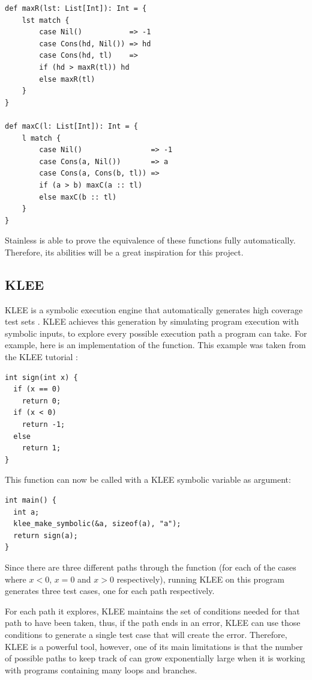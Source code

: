 \begin{verbatim}
def maxR(lst: List[Int]): Int = {
    lst match {
        case Nil()           => -1
        case Cons(hd, Nil()) => hd
        case Cons(hd, tl)    => 
        if (hd > maxR(tl)) hd 
        else maxR(tl)
    }
} 

def maxC(l: List[Int]): Int = {
    l match {
        case Nil()                => -1
        case Cons(a, Nil())       => a
        case Cons(a, Cons(b, tl)) => 
        if (a > b) maxC(a :: tl) 
        else maxC(b :: tl)
    }
}
\end{verbatim}
%
Stainless is able to prove the equivalence of these functions fully automatically. Therefore, its abilities will be a great inspiration for this project. 

\subsection{KLEE}

KLEE is a symbolic execution engine that automatically generates high coverage test sets \parencite{cadarKLEEUnassistedAutomatic2008,ozkanKLEESmarterTest2025}. KLEE achieves this generation by simulating program execution with symbolic inputs, to explore every possible execution path a program can take. For example, here is an implementation of the  function. This example was taken from the KLEE tutorial \parencite{TutorialOneKLEE}:
\begin{verbatim}
int sign(int x) {
  if (x == 0)
    return 0;
  if (x < 0)
    return -1;
  else
    return 1;
}
\end{verbatim}
%

This function can now be called with a KLEE symbolic variable as argument:
\begin{verbatim}
int main() {
  int a;
  klee_make_symbolic(&a, sizeof(a), "a");
  return sign(a);
}
\end{verbatim}
%

Since there are three different paths through the  function (for each of the cases where \(x < 0\), \(x = 0\) and \(x > 0\) respectively), running KLEE on this program generates three test cases, one for each path respectively. 

For each path it explores, KLEE maintains the set of conditions needed for that path to have been taken, thus, if the path ends in an error, KLEE can use those conditions to generate a single test case that will create the error. Therefore, KLEE is a powerful tool, however, one of its main limitations is that the number of possible paths to keep track of can grow exponentially large when it is working with programs containing many loops and branches.

